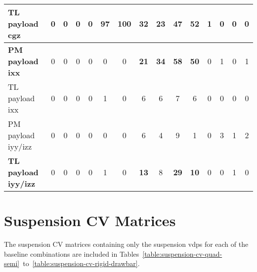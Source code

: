 \begin{table}[H]
\begin{tabular}{|l|c|c|c|c|c|c|c|c|c|c|c|c|c|c|}
    \hline
    \textcolor[rgb]{0.851, 0.373, 0.008}{\textbf{TL payload \gls{cgz}}} & 0 & 0 & 0 & 0 & \textcolor[rgb]{0.000, 0.447, 0.698}{\textbf{97}} & \textcolor[rgb]{0.835, 0.369, 0.000}{\textbf{100}} & \textcolor[rgb]{0.000, 0.620, 0.451}{\textbf{32}} & \textbf{23} & \textcolor[rgb]{0.000, 0.620, 0.451}{\textbf{47}} & \textcolor[rgb]{0.000, 0.447, 0.698}{\textbf{52}} & 1 & 0 & 0 & 0 \\
    \hline
    \textcolor[rgb]{0.000, 0.447, 0.698}{\textbf{PM payload \gls{ixx}}} & 0 & 0 & 0 & 0 & 0 & 0 & \textbf{21} & \textcolor[rgb]{0.000, 0.620, 0.451}{\textbf{34}} & \textcolor[rgb]{0.000, 0.447, 0.698}{\textbf{58}} & \textcolor[rgb]{0.000, 0.447, 0.698}{\textbf{50}} & 0 & 1 & 0 & 1\\
    \hline
    TL payload \gls{ixx} & 0 & 0 & 0 & 0 & 1 & 0 & 6 & 6 & 7 & 6 & 0 & 0 & 0 & 0 \\
    \hline
    PM payload \gls{iyy}/\gls{izz} & 0 & 0 & 0 & 0 & 0 & 0 & 6 & 4 & 9 & 1 & 0 & 3 & 1 & 2 \\
    \hline
    \textcolor[rgb]{0.000, 0.620, 0.451}{\textbf{TL payload \gls{iyy}/\gls{izz}}} & 0 & 0 & 0 & 0 & 1 & 0 & \textbf{13} & 8 & \textcolor[rgb]{0.000, 0.620, 0.451}{\textbf{29}} & \textbf{10} & 0 & 0 & 1 & 0 \\
    \hline

\end{tabular}%
\end{table}%

\newpage
\section{Suspension CV Matrices}\label{section:cv-suspension}

The suspension CV matrices containing only the suspension \glspl{vdp} for each of the baseline combinations are included in Tables~\ref{table:suspension-cv-quad-semi}~to~\ref{table:suspension-cv-rigid-drawbar}.


